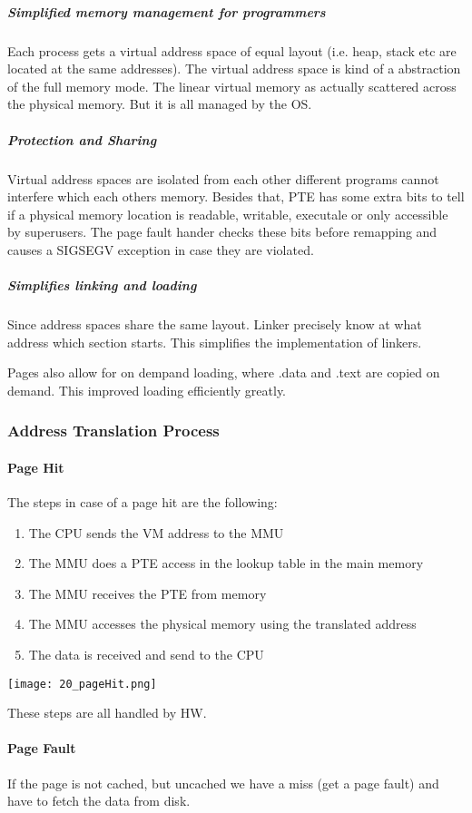\subparagraph{Simplified memory management for programmers}
Each process gets a virtual address space of equal layout (i.e. heap, stack etc are located at the same addresses). The virtual address space is kind of a abstraction of the full memory mode. The linear virtual memory as actually scattered across the physical memory. But it is all managed by the OS.

\subparagraph{Protection and Sharing}
Virtual address spaces are isolated from each other different programs cannot interfere which each others memory. Besides that, PTE has some extra bits to tell if a physical memory location is readable, writable, executale or only accessible by superusers. The page fault hander checks these bits before remapping and causes a SIGSEGV exception in case they are violated.

\subparagraph{Simplifies linking and loading}
Since address spaces share the same layout. Linker precisely know at what address which section starts. This simplifies the implementation of linkers. 

Pages also allow for on dempand loading, where .data and .text are copied on demand. This improved loading efficiently greatly.


\subsubsection{Address Translation Process}

\paragraph{Page Hit}
The steps in case of a page hit are the following:
\begin{enumerate}
    \item The CPU sends the VM address to the MMU
    \item The MMU does a PTE access in the lookup table in the main memory
    \item The MMU receives the PTE from memory
    \item The MMU accesses the physical memory using the translated address
    \item The data is received and send to the CPU
\end{enumerate}

\texttt{[image: 20\_pageHit.png]}

These steps are all handled by HW.

\paragraph{Page Fault}
If the page is not cached, but uncached we have a miss (get a page fault) and have to fetch the data from disk.

